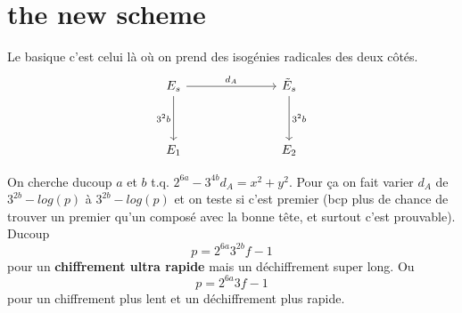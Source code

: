 \documentclass[12pt]{article}
\theoremstyle{plain}
\theoremstyle{definition}
\theoremstyle{remark}
\begin{document}
\section{the new scheme}
Le basique c'est celui là où on prend des isogénies radicales des
deux côtés.
\[\begin{tikzcd}
	{E_s} &&& {\tilde{E}_s} \\
	\\
	{E_1} &&& {E_2}
	\arrow["{d_A}", from=1-1, to=1-4]
	\arrow["{3^2b}"', from=1-1, to=3-1]
	\arrow["{3^2b}", from=1-4, to=3-4]
\end{tikzcd}\]

On cherche ducoup $a$ et $b$ t.q. $2^{6a}-3^{4b}d_A=x^2+y^2$. Pour ça 
on fait varier $d_A$ de $3^{2b}-log(p)$ à $3^{2b}-log(p)$ et on teste 
si c'est premier (bcp plus de chance de trouver un premier qu'un composé
avec la bonne tête, et surtout c'est prouvable). Ducoup 
\[p=2^{6a}3^{2b}f-1\]
pour un \textbf{chiffrement ultra rapide} mais un déchiffrement super 
long. Ou
\[p=2^{6a}3f-1\]
pour un chiffrement plus lent et un déchiffrement plus rapide.
\end{document}
